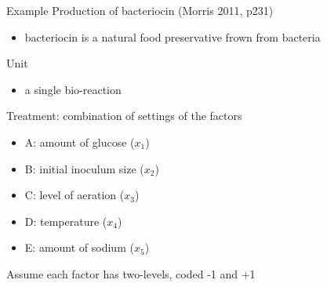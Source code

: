 \documentclass[
  ignorenonframetext,
]{beamer}
\providecommand{\tightlist}{%
  \setlength{\itemsep}{0pt}\setlength{\parskip}{0pt}}
\begin{document}
\begin{frame}{Example}
\protect\hypertarget{example-1}{}
Production of bacteriocin (Morris 2011, p231)

\begin{itemize}
\tightlist
\item
  bacteriocin is a natural food preservative frown from bacteria
\end{itemize}

Unit

\begin{itemize}
\tightlist
\item
  a single bio-reaction
\end{itemize}

Treatment: combination of settings of the factors

\begin{itemize}
\tightlist
\item
  A: amount of glucose (\(x_1\))
\item
  B: initial inoculum size (\(x_2\))
\item
  C: level of aeration (\(x_3\))
\item
  D: temperature (\(x_4\))
\item
  E: amount of sodium (\(x_5\))
\end{itemize}

Assume each factor has two-levels, coded -1 and +1
\end{frame}
\end{document}
